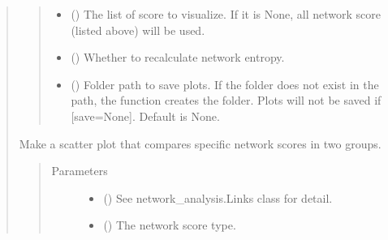 \documentclass[letterpaper,10pt,english]{sphinxmanual}
\begin{document}
\begin{quote}
\begin{fulllineitems}
\begin{fulllineitems}
\begin{quote}
\begin{description}
\begin{itemize}
\item {} 
 () \textendash{} The list of score to visualize. If it is None, all network score (listed above) will be used.

\item {} 
 () \textendash{} Whether to recalculate network entropy.

\item {} 
 () \textendash{} Folder path to save plots. If the folder does not exist in the path, the function creates the folder.
Plots will not be saved if {[}save=None{]}. Default is None.

\end{itemize}

\end{description}\end{quote}

\end{fulllineitems}


\begin{fulllineitems}
\label{\detokenize{modules/celloracle.network_analysis:celloracle.network_analysis.Links.plot_score_comparison_2D}}
Make a scatter plot that compares specific network scores in two groups.
\begin{quote}\begin{description}
\item[{Parameters}] \leavevmode\begin{itemize}
\item {} 
 ({\hyperref[\detokenize{modules/celloracle:celloracle.Links}]{}}) \textendash{} See network\_analysis.Links class for detail.

\item {} 
 () \textendash{} The network score type.


\end{itemize}
\end{description}
\end{quote}
\end{fulllineitems}
\end{fulllineitems}
\end{quote}
\end{document}
